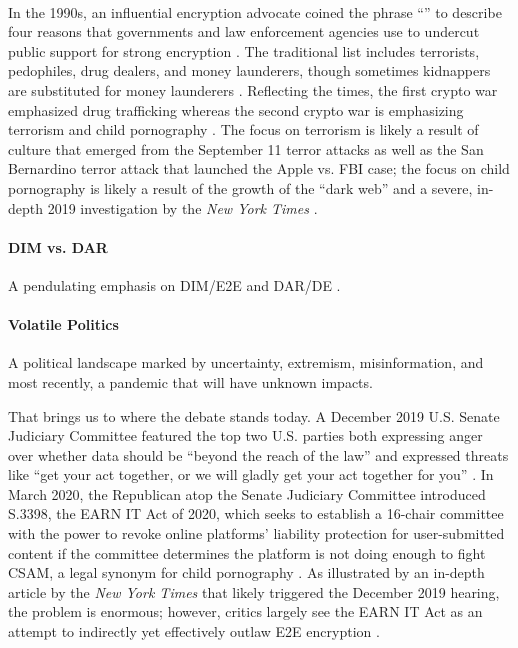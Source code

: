\paragraph*{} In the 1990s, an influential encryption advocate coined the phrase ``''
to describe four reasons that governments and law enforcement agencies use to undercut public support for strong
encryption \cite{may_1994}. The traditional list includes terrorists, pedophiles, drug dealers, and money launderers,
though sometimes kidnappers are substituted for money launderers \cite{schneier_scaring_2019}. Reflecting the times, the
first crypto war emphasized drug trafficking whereas the second crypto war is emphasizing terrorism and child
pornography \cite{schulze_clipper_2017}. The focus on terrorism is likely a result of culture that emerged from the
September 11 terror attacks as well as the San Bernardino terror attack that launched the Apple vs. \ac{FBI} case; the
focus on child pornography is likely a result of the growth of the ``dark web'' and a severe, in-depth 2019
investigation by the \textit{New York Times} \cite{keller_internet_2019}.

\paragraph*{\ac{DIM} vs. \ac{DAR}} A pendulating emphasis on DIM/E2E and DAR/DE \cite{schneier_2019}.

\paragraph*{Volatile Politics} A political landscape marked by uncertainty, extremism, misinformation, and most
recently, a pandemic that will have unknown impacts.

That brings us to where the debate stands today. A December 2019 U.S. Senate Judiciary Committee featured the top two
U.S. parties both expressing anger over whether data should be ``beyond the reach of the law'' and expressed threats
like ``get your act together, or we will gladly get your act together for you'' \cite{geller_2019}. In March 2020, the
Republican atop the Senate Judiciary Committee introduced S.3398, the EARN IT Act of 2020, which seeks to establish a
16-chair committee with the power to revoke online platforms' liability protection for user-submitted content if the
committee determines the platform is not doing enough to fight \ac{CSAM}, a legal synonym for
child pornography \cite{graham_s3398_2020}. As illustrated by an in-depth article by the \textit{New York Times}
\cite{keller_internet_2019} that likely triggered the December 2019 hearing, the problem is enormous; however, critics
largely see the EARN IT Act as an attempt to indirectly yet effectively outlaw \ac{E2E} encryption \cite{newman_2020}
\cite{pfefferkorn_2020}.

